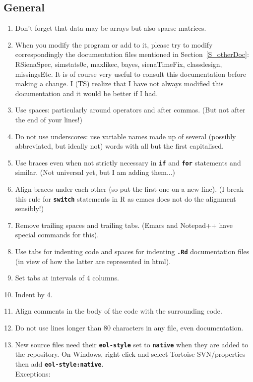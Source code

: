 \documentclass[12pt, a4paper]{article}
\renewcommand{\=}{\,=\,}
\newcommand{\+}{\,+\,}
\newcommand{\sfn}[1]{\textbf{\texttt{#1}}}
\begin{document}
\subsection{General}
\begin{enumerate}
\item Don't forget that data may be arrays but also sparse matrices.
\item When you modify the program or add to it, please try to modify
      correspondingly
      the documentation files mentioned in Section~\ref{S_otherDoc}:
      RSienaSpec, simstats0c, maxlikec, bayes, sienaTimeFix, classdesign,
      missingsEtc.
      It is of course very useful to consult this documentation before making
      a change.
      I (TS) realize that I have not always modified this documentation
      and it would be better if I had.
\item Use spaces: particularly around operators and after commas. (But
  not after the end of your lines!)
\item Do not use underscores: use variable names made up of several (possibly
  abbreviated, but ideally not) words with all but the first capitalised.
\item Use braces even when not strictly necessary in \sfn{if} and \sfn{for}
  statements and similar. (Not universal yet, but I am adding them...)
\item Align braces under each other (so put the first one on a new line). (I
  break this rule for \sfn{switch} statements in R as emacs does not do the
  alignment sensibly!)
\item Remove trailing spaces and trailing tabs. (Emacs and Notepad++ have special
  commands for this).
\item Use tabs for indenting code and spaces for indenting \sfn{.Rd}
  documentation files (in view of how the latter are represented in html).
\item Set tabs at intervals of 4 columns.
\item Indent by 4.
\item Align comments in the body of the code with the surrounding code.
\item Do not use lines longer than 80 characters in any file, even
  documentation.
\item New source files need their \sfn{eol-style} set to \sfn{native} when they
  are added to the repository. On Windows, right-click and select
  Tortoise-SVN/properties then add \sfn{eol-style:native}.  \\
  Exceptions:
  \begin{itemize}

\end{itemize}
\end{enumerate}
\end{document}
